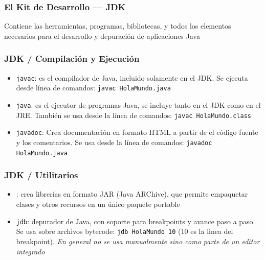 \documentclass{beamer}
\begin{document}
\begin{frame}
  \frametitle{El Kit de Desarrollo --- JDK}

  \begin{exampleblock}{}
  Contiene las herramientas, programas, bibliotecas, y todos los
  elementos necesarios para el desarrollo y depuración de aplicaciones Java
  \end{exampleblock}

\end{frame}


\begin{frame}
  \frametitle{JDK / Compilación y Ejecución}  

  \begin{itemize}
    
  \item \texttt{javac}: es el compilador de Java, incluido solamente
    en el JDK. Se ejecuta desde línea de comandos: \texttt{javac HolaMundo.java}

  \item \texttt{java}: es el ejecutor de programas Java, se incluye
    tanto en el JDK como en el JRE. También se usa desde la línea de
    comandos: \texttt{javac HolaMundo.class}

  \item \texttt{javadoc}: Crea documentación en formato HTML a partir
    de el código fuente y los comentarios. Se usa desde la línea de
    comandos: \texttt{javadoc HolaMundo.java}    
    
  \end{itemize}

\end{frame}

\begin{frame}
  \frametitle{JDK / Utilitarios}

  \begin{itemize}
    
  \item {}: crea librerías en formato JAR (Java ARChive), que
    permite empaquetar clases y otros recursos en un único paquete
    portable

  \item \texttt{jdb}: depurador de Java, con soporte para breakpoints
    y avance paso a paso. Se usa sobre archivos bytecode: \texttt {jdb
      HolaMundo 10} (10 es la linea del breakpoint). \emph{En general
      no se usa manualmente sino como parte de un editor integrado}
        
  \end{itemize}

\end{frame}
 
\end{document}
